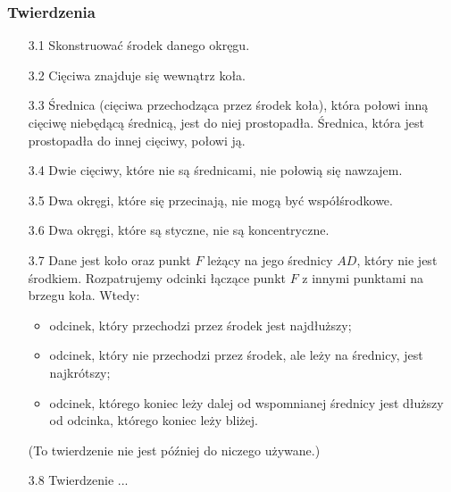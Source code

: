 \subsubsection{Twierdzenia}
\begin{enumerate}
    \item [3.1] Skonstruować środek danego okręgu.      
    \item [3.2] Cięciwa znajduje się wewnątrz koła.
    \item [3.3] Średnica (cięciwa przechodząca przez środek koła), która połowi inną cięciwę niebędącą średnicą, jest do niej prostopadła. Średnica, która jest prostopadła do innej cięciwy, połowi ją.
    \item [3.4] Dwie cięciwy, które nie są średnicami, nie połowią się nawzajem.
    \item [3.5] Dwa okręgi, które się przecinają, nie mogą być współśrodkowe. 
    \item [3.6] Dwa okręgi, które są styczne, nie są koncentryczne.
    \item [3.7] Dane jest koło oraz punkt $F$ leżący na jego średnicy $AD$, który nie jest środkiem. Rozpatrujemy odcinki łączące punkt $F$ z innymi punktami na brzegu koła. Wtedy:
        \begin{itemize}
        \item odcinek, który przechodzi przez środek jest najdłuższy;
        \item odcinek, który nie przechodzi przez środek, ale leży na średnicy, jest najkrótszy;
        \item odcinek, którego koniec leży dalej od wspomnianej średnicy jest dłuższy od odcinka, którego koniec leży bliżej.
        \end{itemize}
    (To twierdzenie nie jest później do niczego używane.)
    \item [3.8] Twierdzenie ...

\end{enumerate}
